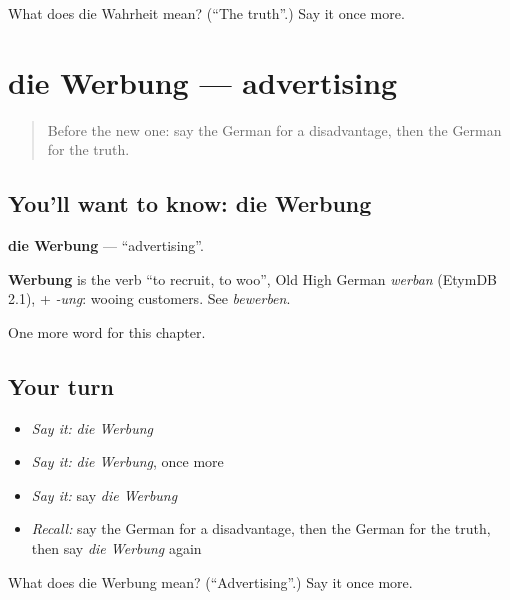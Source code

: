 \begin{tcolorbox}[breakable,colback=teal!4,colframe=teal!35!black,title={Before you move on}]
What does die Wahrheit mean? (\textquotedblleft{}The truth\textquotedblright{}.) Say it once more.
\end{tcolorbox}
\section[die Werbung]{die Werbung — advertising}

\label{lesson:GE-C243-werbung}



\begin{quote}
Before the new one: say the German for a disadvantage, then the German for the truth.
\end{quote}

\subsection*{You'll want to know: die Werbung}
\textbf{die Werbung} — \textquotedblleft{}advertising\textquotedblright{}.

\begin{cousinweb}
\textbf{Werbung} is the verb \textquotedblleft{}to recruit, to woo\textquotedblright{}, Old High German \emph{werban} (EtymDB 2.1), + \emph{-ung}: wooing customers. See \emph{bewerben}.
\end{cousinweb}

\begin{grammarlens}[title={What you've built}]
One more word for this chapter.
\end{grammarlens}

\subsection*{Your turn}
\begin{itemize}
\raggedright
  \item \emph{Say it:} \emph{die Werbung}
  \item \emph{Say it:} \emph{die Werbung}, once more
  \item \emph{Say it:} say \emph{die Werbung}
  \item \emph{Recall:} say the German for a disadvantage, then the German for the truth, then say \emph{die Werbung} again
\end{itemize}

\begin{tcolorbox}[breakable,colback=teal!4,colframe=teal!35!black,title={Before you move on}]
What does die Werbung mean? (\textquotedblleft{}Advertising\textquotedblright{}.) Say it once more.
\end{tcolorbox}
